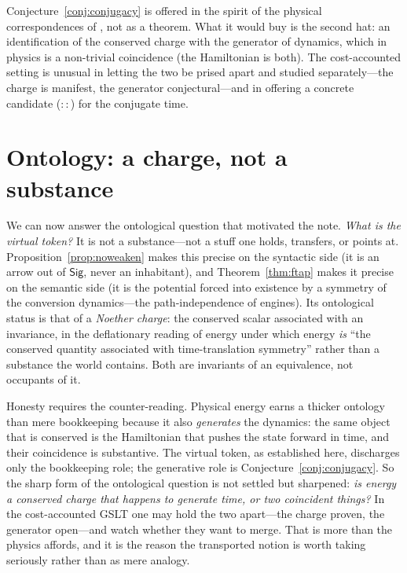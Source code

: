 \documentclass[11pt]{article}
\theoremstyle{definition}
\theoremstyle{plain}
\theoremstyle{remark}
\newcommand{\Sig}{\mathsf{Sig}}
\begin{document}
Conjecture~\ref{conj:conjugacy} is offered in the spirit of the physical correspondences of
\cite[\S13]{CE}, not as a theorem. What it would buy is the second hat: an identification of the
conserved charge with the generator of dynamics, which in physics is a non-trivial coincidence
(the Hamiltonian is both). The cost-accounted setting is unusual in letting the two be prised apart
and studied separately---the charge is manifest, the generator conjectural---and in offering a
concrete candidate ($::$) for the conjugate time.

\section{Ontology: a charge, not a substance}
\label{sec:ontology}

We can now answer the ontological question that motivated the note. \emph{What is the virtual
token?} It is not a substance---not a stuff one holds, transfers, or points at.
Proposition~\ref{prop:noweaken} makes this precise on the syntactic side (it is an arrow out of
$\Sig$, never an inhabitant), and Theorem~\ref{thm:ftap} makes it precise on the semantic side (it
is the potential forced into existence by a symmetry of the conversion dynamics---the
path-independence of engines). Its ontological status is that of a \emph{Noether charge}: the
conserved scalar associated with an invariance, in the deflationary reading of energy under which
energy \emph{is} ``the conserved quantity associated with time-translation symmetry'' rather than a
substance the world contains. Both are invariants of an equivalence, not occupants of it.

Honesty requires the counter-reading. Physical energy earns a thicker ontology than mere
bookkeeping because it also \emph{generates} the dynamics: the same object that is conserved is the
Hamiltonian that pushes the state forward in time, and their coincidence is substantive. The
virtual token, as established here, discharges only the bookkeeping role; the generative role is
Conjecture~\ref{conj:conjugacy}. So the sharp form of the ontological question is not settled but
sharpened: \emph{is energy a conserved charge that happens to generate time, or two coincident
things?} In the cost-accounted GSLT one may hold the two apart---the charge proven, the generator
open---and watch whether they want to merge. That is more than the physics affords, and it is the
reason the transported notion is worth taking seriously rather than as mere analogy.
\end{document}
